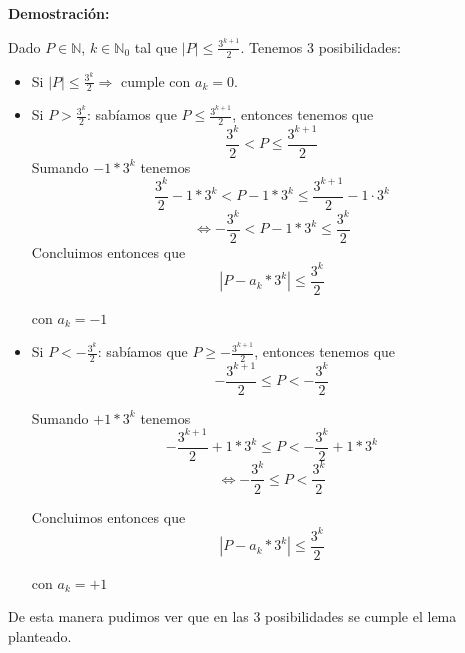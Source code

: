 \textbf{Demostración:}
\par Dado $P \in \mathds{N}$, $k \in \mathds{N}_0$ tal que $|P| \leq \frac{3^{k+1}}{2}$. Tenemos 3 posibilidades:
\begin{itemize}
	\item Si $|P| \leq \frac{3^{k}}{2} \Longrightarrow$ cumple con $a_{k}=0$.

	\item Si $P > \frac{3^{k}}{2}$: sabíamos que $P \leq \frac{3^{k+1}}{2}$, entonces tenemos que
	\begin{equation}
		\frac{3^{k}}{2} < P \leq \frac{3^{k+1}}{2}
	\end{equation}
	Sumando $-1 * 3^{k}$ tenemos
	\begin{equation}
		\frac{3^{k}}{2} -1 * 3^{k} < P -1 * 3^{k} \leq \frac{3^{k+1}}{2} -1 \cdot 3^{k}
	\end{equation}
	\begin{equation}
		\Longleftrightarrow -\frac{3^{k}}{2} < P -1 * 3^{k} \leq \frac{3^{k}}{2}
	\end{equation}
	Concluimos entonces que
	\begin{equation}
		| P - a_{k} * 3^k | \leq \frac{3^k}{2}
	\end{equation}
	\begin{flushright}
		con $a_{k} = -1$
	\end{flushright}

	\item Si $P < -\frac{3^{k}}{2}$: sabíamos que $P \geq -\frac{3^{k+1}}{2}$, entonces tenemos que
	\begin{equation}
		-\frac{3^{k+1}}{2} \leq P < -\frac{3^{k}}{2}
	\end{equation}
	\par Sumando $+1 * 3^{k}$ tenemos
	\begin{equation}
		-\frac{3^{k+1}}{2} +1 * 3^{k} \leq P < -\frac{3^{k}}{2} +1 * 3^{k}
	\end{equation}
	\begin{equation}
		\Longleftrightarrow -\frac{3^{k}}{2} \leq P < \frac{3^{k}}{2}
	\end{equation}
	\par Concluimos entonces que
	\begin{equation}
		| P - a_{k} * 3^k | \leq \frac{3^k}{2}
	\end{equation}
	\begin{flushright}
		con $a_{k} = +1$
	\end{flushright}
\end{itemize}
\par De esta manera pudimos ver que en las 3 posibilidades se cumple el lema planteado.

